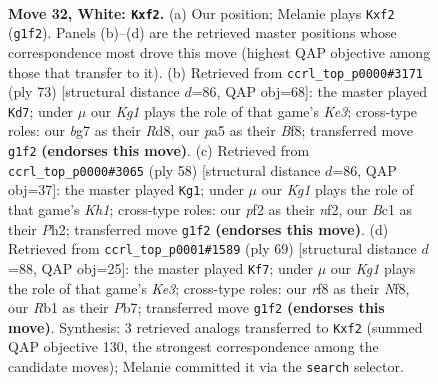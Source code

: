\documentclass[11pt]{article}
\begin{document}
\clearpage

\begin{figure}[p]\centering
\begin{subfigure}{0.46\textwidth}\centering
\resizebox{\linewidth}{!}{%
\newchessgame
\chessboard[
  setfen={1n3r1k/6b1/BP3n2/p7/b1P5/4N1P1/R4p2/1RB3K1 w - - 0 32},
  showmover=false,
  pgfstyle=straightmove, color=movearrow, markmove={g1-f2}
]}
\caption{}
\end{subfigure}\hfill
\begin{subfigure}{0.46\textwidth}\centering
\resizebox{\linewidth}{!}{%
\newchessgame
\chessboard[
  setfen={3r1b2/pp5p/3nk3/4R3/4NB2/4P3/P6K/8 b - - 3 37},
  showmover=false,
  pgfstyle=straightmove, color=movearrow, markmove={e6-d7}
]}
\caption{}
\end{subfigure}
\\[4pt]
\begin{subfigure}{0.46\textwidth}\centering
\resizebox{\linewidth}{!}{%
\newchessgame
\chessboard[
  setfen={5k2/6bp/3p4/3N4/2B2P2/2P5/3r1n1P/5R1K w - - 3 30},
  showmover=false,
  pgfstyle=straightmove, color=movearrow, markmove={h1-g1}
]}
\caption{}
\end{subfigure}\hfill
\begin{subfigure}{0.46\textwidth}\centering
\resizebox{\linewidth}{!}{%
\newchessgame
\chessboard[
  setfen={5n2/1pr3b1/p3k1pp/8/P7/4RN1P/1P1B2P1/1K6 b - - 15 35},
  showmover=false,
  pgfstyle=straightmove, color=movearrow, markmove={e6-f7}
]}
\caption{}
\end{subfigure}
\caption{\textbf{Move 32, White: \texttt{Kxf2}.} (a) Our position; Melanie plays \texttt{Kxf2} (\texttt{g1f2}). Panels (b)--(d) are the retrieved master positions whose correspondence most drove this move (highest QAP objective among those that transfer to it). (b) Retrieved from \texttt{ccrl\_top\_p0000\#3171} (ply 73) [structural distance $d$=86, QAP obj=68]: the master played \texttt{Kd7}; under $\mu$ our \emph{Kg1} plays the role of that game's \emph{Ke3}; cross-type roles: our \emph{b}g7 as their \emph{R}d8, our \emph{p}a5 as their \emph{B}f8; transferred move \texttt{g1f2} \textbf{(endorses this move)}. (c) Retrieved from \texttt{ccrl\_top\_p0000\#3065} (ply 58) [structural distance $d$=86, QAP obj=37]: the master played \texttt{Kg1}; under $\mu$ our \emph{Kg1} plays the role of that game's \emph{Kh1}; cross-type roles: our \emph{p}f2 as their \emph{n}f2, our \emph{B}c1 as their \emph{P}h2; transferred move \texttt{g1f2} \textbf{(endorses this move)}. (d) Retrieved from \texttt{ccrl\_top\_p0001\#1589} (ply 69) [structural distance $d$=88, QAP obj=25]: the master played \texttt{Kf7}; under $\mu$ our \emph{Kg1} plays the role of that game's \emph{Ke3}; cross-type roles: our \emph{r}f8 as their \emph{N}f8, our \emph{R}b1 as their \emph{P}b7; transferred move \texttt{g1f2} \textbf{(endorses this move)}. Synthesis: 3 retrieved analogs transferred to \texttt{Kxf2} (summed QAP objective 130, the strongest correspondence among the candidate moves); Melanie committed it via the \texttt{search} selector.}
\label{fig:thought-m62}
\end{figure}
\end{document}
